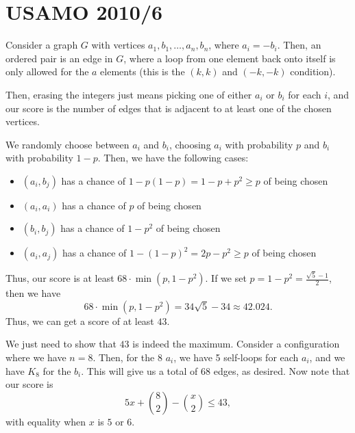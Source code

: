 \documentclass[11pt]{scrartcl}
\begin{document}
\section{USAMO 2010/6}
Consider a graph $G$ with vertices $a_1, b_1, \dots, a_n, b_n$, where $a_i = -b_i$. Then, an ordered pair is an edge in $G$, where a loop from one element back onto itself is only allowed for the $a$ elements (this is the $(k, k)$ and $(-k, -k)$ condition). 

Then, erasing the integers just means picking one of either $a_i$ or $b_i$ for each $i$, and our score is the number of edges that is adjacent to at least one of the chosen vertices. 

We randomly choose between $a_i$ and $b_i$, choosing $a_i$ with probability $p$ and $b_i$ with probability $1-p$. Then, we have the following cases: 
\begin{itemize}
\item $(a_i, b_j)$ has a chance of $1-p(1-p) = 1-p + p^2 \geq p$ of being chosen
\item $(a_i, a_i)$ has a chance of $p$ of being chosen
\item $(b_i, b_j)$ has a chance of $1-p^2$ of being chosen
\item $(a_i, a_j)$ has a chance of $1-(1-p)^2=2p-p^2 \geq p$ of being chosen
\end{itemize}
Thus, our score is at least $68\cdot \min(p, 1-p^2)$. If we set $p=1-p^2=\frac{\sqrt{5}-1}{2}$, then we have
\[68 \cdot \min(p, 1-p^2) = 34\sqrt{5} - 34 \approx 42.024.\]
Thus, we can get a score of at least $\boxed{43}$. 

We just need to show that $43$ is indeed the maximum. Consider a configuration where we have $n=8$. Then, for the 8 $a_i$, we have 5 self-loops for each $a_i$, and we have $K_8$ for the $b_i$. This will give us a total of $68$ edges, as desired. Now note that our score is 
\[5x + \binom{8}{2} - \binom{x}{2} \leq 43,\]
with equality when $x$ is $5$ or $6$. 
\end{document}
